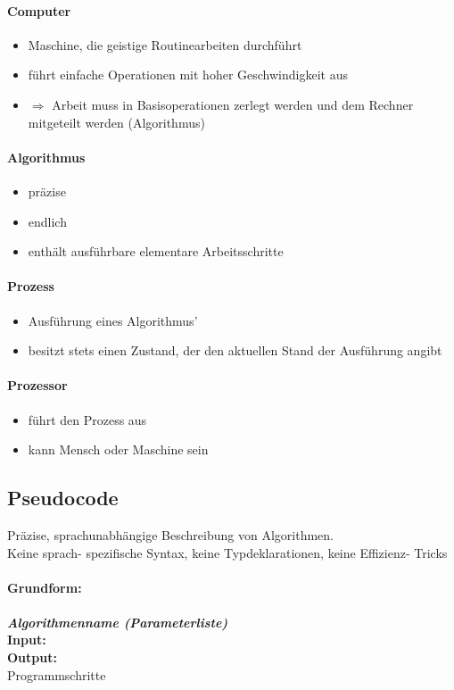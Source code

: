 \documentclass[fleqn]{scrartcl}
\begin{document}
\paragraph*{Computer}
\begin{itemize}
\item Maschine, die geistige Routinearbeiten durchführt
\item führt einfache Operationen mit hoher Geschwindigkeit aus
\item $\Rightarrow$ Arbeit muss in Basisoperationen zerlegt werden und dem Rechner mitgeteilt werden (Algorithmus)
\end{itemize}
\paragraph*{Algorithmus}
\begin{itemize}
\item präzise
\item endlich
\item enthält ausführbare elementare Arbeitsschritte
\end{itemize}
\paragraph*{Prozess}
\begin{itemize}
\item Ausführung eines Algorithmus'
\item besitzt stets einen Zustand, der den aktuellen Stand der Ausführung angibt
\end{itemize}
\paragraph*{Prozessor}
\begin{itemize}
\item führt den Prozess aus
\item kann Mensch oder Maschine sein
\end{itemize}
\subsection{Pseudocode}
Präzise, sprachunabhängige Beschreibung von Algorithmen.\\
Keine sprach- spezifische Syntax, keine Typdeklarationen, keine Effizienz- Tricks\\
\\
\textbf{Grundform:}\\\\
\textbf{\emph{Algorithmenname (Parameterliste)\\}}
\textbf{Input:\\
Output:\\}
Programmschritte\\
\end{document}
